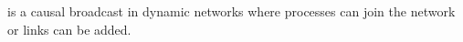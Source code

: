 







\begin{lemma}
  \CBROADCAST is a causal broadcast in dynamic networks where processes can join
  the network or links can be added.
\end{lemma}

